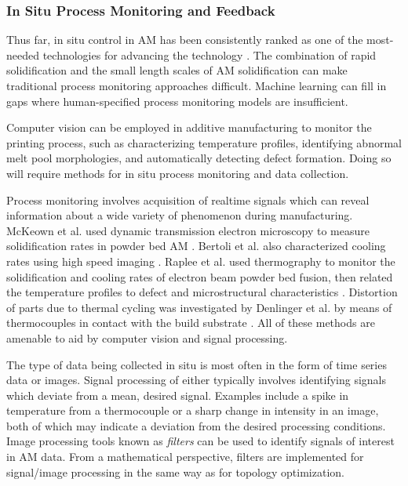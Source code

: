 \subsubsection{In Situ Process Monitoring and Feedback}

Thus far, in situ control in AM has been consistently ranked as one of the most-needed technologies for advancing the technology \cite{Berumen2010, Tapia2014, Mani2017}. The combination of rapid solidification and the small length scales of AM solidification can make traditional process monitoring approaches difficult. Machine learning can fill in gaps where human-specified process monitoring models are insufficient.

Computer vision can be employed in additive manufacturing to monitor the printing process, such as characterizing temperature profiles, identifying abnormal melt pool morphologies, and automatically detecting defect formation. Doing so will require methods for in situ process monitoring and data collection. 

Process monitoring involves acquisition of realtime signals which can reveal information about a wide variety of phenomenon during manufacturing. McKeown et al. used dynamic transmission electron microscopy to measure solidification rates in powder bed AM \cite{McKeown2016}. Bertoli et al. also characterized cooling rates using high speed imaging \cite{Bertoli2017}. Raplee et al. used thermography to monitor the solidification and cooling rates of electron beam powder bed fusion, then related the temperature profiles to defect and microstructural characteristics \cite{Raplee2017}. Distortion of parts due to thermal cycling was investigated by Denlinger et al. by means of thermocouples in contact with the build substrate \cite{Denlinger2015}. All of these methods are amenable to aid by computer vision and signal processing.

The type of data being collected in situ is most often in the form of time series data or images. Signal processing of either typically involves identifying signals which deviate from a mean, desired signal. Examples include a spike in temperature from a thermocouple or a sharp change in intensity in an image, both of which may indicate a deviation from the desired processing conditions. Image processing tools known as \textit{filters} can be used to identify signals of interest in AM data. From a mathematical perspective, filters are implemented for signal/image processing in the same way as for topology optimization. 

